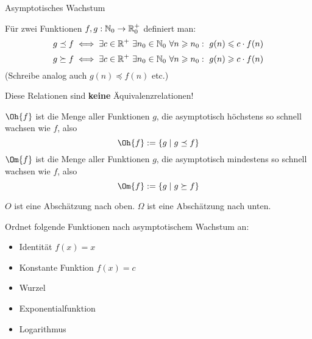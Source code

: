 \begin{frame}{Asymptotisches Wachstum}
	\begin{Definition}
		Für zwei Funktionen $f,g: \mathbb{N}_0 \to \mathbb{R}_0^+$ definiert man:
		$$g \preceq f \Gdw \exists c \in \R^+ \ \exists n_0 \in \N_0 \ \forall n \geq n_0: \ g(n) \leq c \* f(n)$$
		$$g \succeq f \Gdw \exists c \in \R^+ \ \exists n_0 \in \N_0 \ \forall n \geq n_0: \ g(n) \geq c \* f(n)$$
		(Schreibe analog auch $g(n) \preceq f(n)$ etc.)
	\end{Definition} \pause
	Diese Relationen sind \textbf{keine} Äquivalenzrelationen!
\end{frame}

\begin{frame}[t]{} %
	\begin{Definition}
		$\Oh{f}$ ist die Menge aller Funktionen $g$, die asymptotisch höchstens so schnell wachsen wie $f$, also $$\Oh{f} := \{ g \mid g \preceq f \}$$
		$\Om{f}$ ist die Menge aller Funktionen $g$, die asymptotisch mindestens so schnell wachsen wie $f$, also $$\Om{f} := \{ g \mid g \succeq f \}$$
	\end{Definition} \pause
	\impl $O$ ist eine Abschätzung nach oben. $\Omega$ ist eine Abschätzung nach unten.
\end{frame}


%


\begin{frame}[t]{} %
	Ordnet folgende Funktionen nach asymptotischem Wachstum an:
	\begin{itemize}
		\item Identität $f(x) = x$
		\item Konstante Funktion $f(x) = c$
		\item Wurzel
		\item Exponentialfunktion
		\item Logarithmus
	\end{itemize}
\end{frame}

